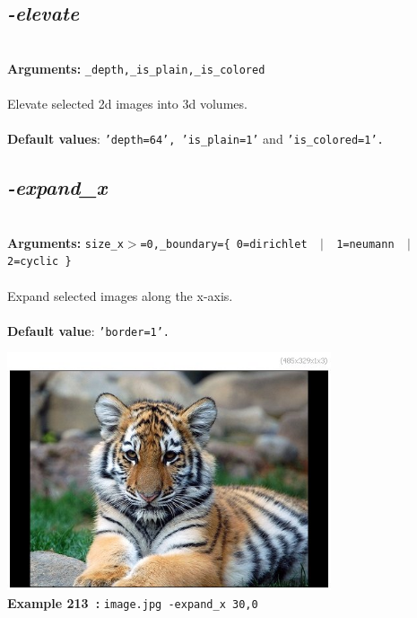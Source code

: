 \documentclass[a4paper,11pt,twoside]{book}
\begin{document}
\subsection{\emph{-elevate} }\vspace*{-0.5em}
~\\\textbf{Arguments: } 
{\small \texttt{\_depth,\_is\_plain,\_is\_colored}}\\~\\
Elevate selected 2d images into 3d volumes.
~\\~\\\textbf{Default values}: {\small \texttt{'depth=64', 'is\_plain=1'} and \texttt{'is\_colored=1'.}}


\subsection{\emph{-expand\_x} }\vspace*{-0.5em}
~\\\textbf{Arguments: } 
{\small \texttt{size\_x$>$=0,\_boundary=\{ 0=dirichlet ~$|$~ 1=neumann ~$|$~ 2=cyclic \}}}\\~\\
Expand selected images along the x-axis.
~\\~\\\textbf{Default value}: {\small \texttt{'border=1'.}}
\begin{center}\includegraphics[keepaspectratio=true,height=7cm,width=\textwidth]{img/gmic_def213.jpg}\\
{\footnotesize \textbf{Example 213~:} \texttt{image.jpg -expand\_x 30,0}}
\end{center}
\end{document}
